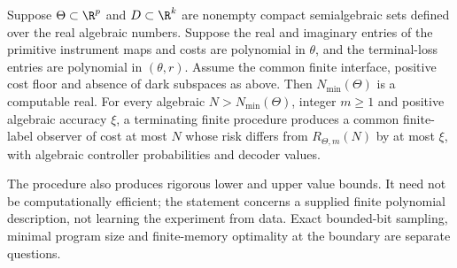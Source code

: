 \begin{corollary}\label{cor:compact-algebraic}
Suppose $\Theta\subset\R^p$ and $D\subset\R^k$ are nonempty compact semialgebraic sets defined over the real algebraic numbers. Suppose the real and imaginary entries of the primitive instrument maps and costs are polynomial in $\theta$, and the terminal-loss entries are polynomial in $(\theta,r)$. Assume the common finite interface, positive cost floor and absence of dark subspaces as above. Then $N_{\min}(\Theta)$ is a computable real. For every algebraic $N>N_{\min}(\Theta)$, integer $m\ge1$ and positive algebraic accuracy $\xi$, a terminating finite procedure produces a common finite-label observer of cost at most $N$ whose risk differs from $R_{\Theta,m}(N)$ by at most $\xi$, with algebraic controller probabilities and decoder values.

The procedure also produces rigorous lower and upper value bounds. It need not be computationally efficient; the statement concerns a supplied finite polynomial description, not learning the experiment from data. Exact bounded-bit sampling, minimal program size and finite-memory optimality at the boundary are separate questions.
\end{corollary}
